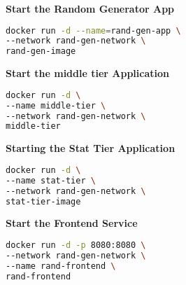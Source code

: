 \textbf{Start the Random Generator App}
\begin{lstlisting}[language=Bash]
docker run -d --name=rand-gen-app \
--network rand-gen-network \
rand-gen-image
\end{lstlisting}

\textbf{Start the middle tier Application}
\begin{lstlisting}[language=Bash]
docker run -d \
--name middle-tier \
--network rand-gen-network \
middle-tier
\end{lstlisting}

\textbf{Starting the Stat Tier Application}
\begin{lstlisting}[language=Bash]
docker run -d \
--name stat-tier \
--network rand-gen-network \ 
stat-tier-image
\end{lstlisting}

\textbf{Start the Frontend Service}
\begin{lstlisting}[language=Bash]
docker run -d -p 8080:8080 \
--network rand-gen-network \
--name rand-frontend \
rand-frontend
\end{lstlisting}